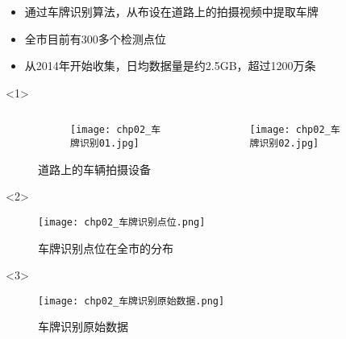 \begin{frame}[t]{\subsecname}
\begin{itemize}
\item<1-> 通过车牌识别算法，从布设在道路上的拍摄视频中提取车牌
\item<2-> 全市目前有300多个检测点位
\item<3-> 从2014年开始收集，日均数据量是约2.5GB，超过1200万条 
\end{itemize}

\begin{overlayarea}{\textwidth}{\textheight}
\begin{onlyenv}<1>
\begin{figure} \centering
\begin{columns}[b]
  \begin{column}{.5\textwidth}
    \begin{figure}\flushright
      \texttt{[image: chp02\_车牌识别01.jpg]}
    \end{figure}
  \end{column}
  \begin{column}{.5\textwidth}
    \begin{figure}\flushleft
      \texttt{[image: chp02\_车牌识别02.jpg]}
    \end{figure}
  \end{column}
\end{columns}
\caption{道路上的车辆拍摄设备} 
\end{figure}
\end{onlyenv}

\vspace{-15pt}
  \begin{onlyenv}<2>
\begin{figure}
  \centering
  \texttt{[image: chp02\_车牌识别点位.png]}
  \caption{车牌识别点位在全市的分布}
\end{figure}
  \end{onlyenv}

  \begin{onlyenv}<3>
\begin{figure}
  \centering
  \texttt{[image: chp02\_车牌识别原始数据.png]}
  \caption{车牌识别原始数据}
\end{figure}
  \end{onlyenv}
\end{overlayarea}
\end{frame}

